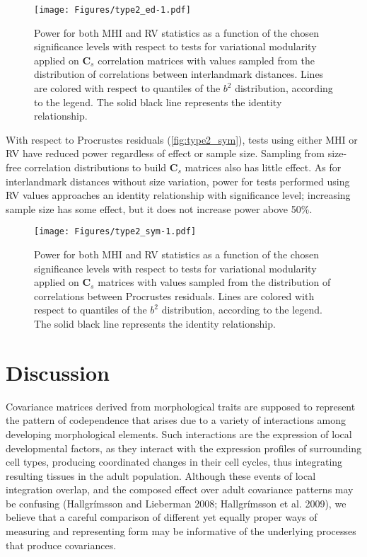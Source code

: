 \documentclass[12pt,]{article}
\begin{document}
\begin{figure}[htbp]
\centering
\texttt{[image: Figures/type2\_ed-1.pdf]}
\caption{Power for both MHI and RV statistics as a function of the
chosen significance levels with respect to tests for variational
modularity applied on $\mathbf{C}_s$ correlation matrices with values
sampled from the distribution of correlations between interlandmark
distances. Lines are colored with respect to quantiles of the $b^2$
distribution, according to the legend. The solid black line represents
the identity relationship. \label{fig:type2_ed}}
\end{figure}

With respect to Procrustes residuals (\autoref{fig:type2_sym}), tests
using either MHI or RV have reduced power regardless of effect or sample
size. Sampling from size-free correlation distributions to build
$\mathbf{C}_s$ matrices also has little effect. As for interlandmark
distances without size variation, power for tests performed using RV
values approaches an identity relationship with significance level;
increasing sample size has some effect, but it does not increase power
above 50\%.

\begin{figure}[htbp]
\centering
\texttt{[image: Figures/type2\_sym-1.pdf]}
\caption{Power for both MHI and RV statistics as a function of the
chosen significance levels with respect to tests for variational
modularity applied on $\mathbf{C}_s$ matrices with values sampled from
the distribution of correlations between Procrustes residuals. Lines are
colored with respect to quantiles of the $b^2$ distribution, according
to the legend. The solid black line represents the identity
relationship. \label{fig:type2_sym}}
\end{figure}

\section{Discussion}\label{discussion}

Covariance matrices derived from morphological traits are supposed to
represent the pattern of codependence that arises due to a variety of
interactions among developing morphological elements. Such interactions
are the expression of local developmental factors, as they interact with
the expression profiles of surrounding cell types, producing coordinated
changes in their cell cycles, thus integrating resulting tissues in the
adult population. Although these events of local integration overlap,
and the composed effect over adult covariance patterns may be confusing
(Hallgrímsson and Lieberman 2008; Hallgrímsson et al. 2009), we believe
that a careful comparison of different yet equally proper ways of
measuring and representing form may be informative of the underlying
processes that produce covariances.
\end{document}
